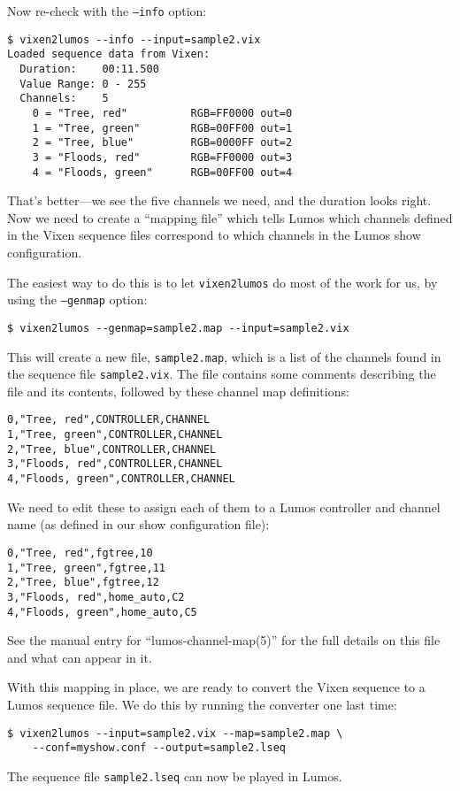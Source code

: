 \documentclass{article}
\begin{document}
\noindent%

Now re-check with the {\tt --info} option:
\begin{verbatim}
$ vixen2lumos --info --input=sample2.vix
Loaded sequence data from Vixen:
  Duration:    00:11.500
  Value Range: 0 - 255
  Channels:    5
    0 = "Tree, red"          RGB=FF0000 out=0
    1 = "Tree, green"        RGB=00FF00 out=1
    2 = "Tree, blue"         RGB=0000FF out=2
    3 = "Floods, red"        RGB=FF0000 out=3
    4 = "Floods, green"      RGB=00FF00 out=4
\end{verbatim}

That's better---we see the five channels we need, and the duration looks right.
Now we need to create a ``mapping file'' which tells Lumos which channels
defined in the Vixen sequence files correspond to which channels in the
Lumos show configuration.

The easiest way to do this is to let {\tt vixen2lumos} do most of the work
for us, by using the {\tt --genmap} option:
\begin{verbatim}
$ vixen2lumos --genmap=sample2.map --input=sample2.vix
\end{verbatim}
This will create a new file, {\tt sample2.map}, which is a list of the
channels found in the sequence file {\tt sample2.vix}.  The file contains
some comments describing the file and its contents, followed by these channel
map definitions:
\begin{verbatim}
0,"Tree, red",CONTROLLER,CHANNEL
1,"Tree, green",CONTROLLER,CHANNEL
2,"Tree, blue",CONTROLLER,CHANNEL
3,"Floods, red",CONTROLLER,CHANNEL
4,"Floods, green",CONTROLLER,CHANNEL
\end{verbatim}
We need to edit these to assign each of them to a Lumos controller and
channel name (as defined in our show configuration file):
\begin{verbatim}
0,"Tree, red",fgtree,10
1,"Tree, green",fgtree,11
2,"Tree, blue",fgtree,12
3,"Floods, red",home_auto,C2
4,"Floods, green",home_auto,C5
\end{verbatim}
See the manual entry for ``lumos-channel-map(5)'' for the full details on
this file and what can appear in it.

With this mapping in place, we are ready to convert the Vixen sequence to a
Lumos sequence file.  We do this by running the converter one last time:
\begin{verbatim}
$ vixen2lumos --input=sample2.vix --map=sample2.map \
    --conf=myshow.conf --output=sample2.lseq
\end{verbatim}
The sequence file {\tt sample2.lseq} can now be played in Lumos.
\end{document}
